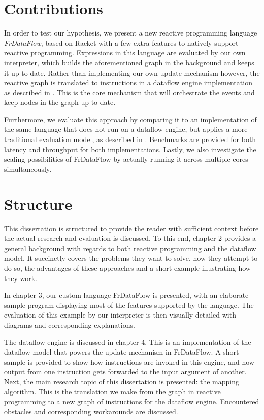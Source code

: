 \section{Contributions}

In order to test our hypothesis, we present a new reactive programming language \textit{FrDataFlow}, based on Racket with a few extra features to natively support reactive programming. Expressions in this language are evaluated by our own interpreter, which builds the aforementioned graph in the background and keeps it up to date. Rather than implementing our own update mechanism however, the reactive graph is translated to instructions in a dataflow engine implementation as described in \cite{saey_extensible_2017}. This is the core mechanism that will orchestrate the events and keep nodes in the graph up to date.

Furthermore, we evaluate this approach by comparing it to an implementation of the same language that does not run on a dataflow engine, but applies a more traditional evaluation model, as described in \cite{cooper_embedding_2006}. Benchmarks are provided for both latency and throughput for both implementations. Lastly, we also investigate the scaling possibilities of FrDataFlow by actually running it across multiple cores simultaneously. 

\section{Structure}

This dissertation is structured to provide the reader with sufficient context before the actual research and evaluation is discussed. To this end, chapter 2 provides a general background with regards to both reactive programming and the dataflow model. It succinctly covers the problems they want to solve, how they attempt to do so, the advantages of these approaches and a short example illustrating how they work.

In chapter 3, our custom language FrDataFlow is presented, with an elaborate sample program displaying most of the features supported by the language. The evaluation of this example by our interpreter is then visually detailed with diagrams and corresponding explanations. 

The dataflow engine is discussed in chapter 4. This is an implementation of the dataflow model that powers the update mechanism in FrDataFlow. A short sample is provided to show how instructions are invoked in this engine, and how output from one instruction gets forwarded to the input argument of another. Next, the main research topic of this dissertation is presented: the mapping algorithm. This is the translation we make from the graph in reactive programming to a new graph of instructions for the dataflow engine. Encountered obstacles and corresponding workarounds are discussed.

